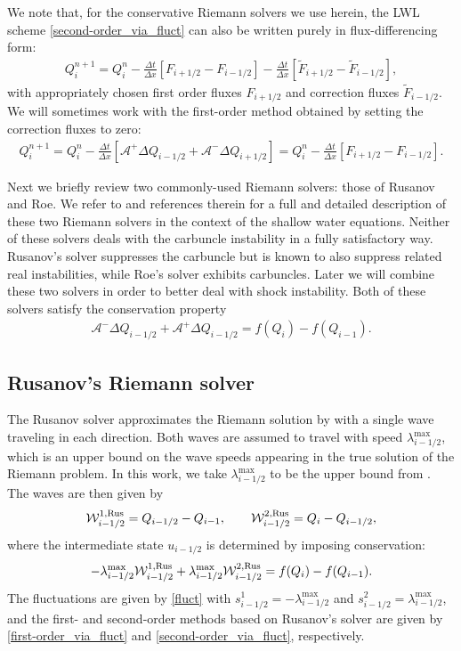 \documentclass[preprint, 11pt]{article}
\newcommand{\W}{{\mathcal W}}
\newcommand{\A}{{\mathcal A}}
\newcommand{\apdq}{\A^+ \!\!{\Delta} Q}
\newcommand{\amdq}{\A^- \!\!{\Delta} Q}
\newcommand{\imh}{{i-1/2}}
\newcommand{\iph}{{i+1/2}}
\newcommand{\bff}{{f}}
\newcommand{\bfF}{{F}}
\newcommand{\bfu}{{u}}
\newcommand{\bfq}{{Q}}
\newcommand{\Rus}{{\rm Rus}}
\begin{document}
We note that, for the conservative Riemann solvers we use herein, the LWL scheme
\eqref{second-order_via_fluct} can also be written purely in flux-differencing
form:
\begin{align}\label{flux-differencing-form}
  Q_i^{n+1}=Q_i^n-\frac{\Delta t}{\Delta x}\left[\bfF_{i+1/2}-\bfF_{i-1/2}\right]
 -\frac{\Delta t}{\Delta x}\left[\tilde{F}_{i+1/2}-\tilde{F}_{i-1/2}\right],
\end{align}
with appropriately chosen first order fluxes $\bfF_{i+1/2}$ and correction
fluxes $\tilde{F}_{i-1/2}$.
We will sometimes work with
the first-order method obtained by setting the correction fluxes to zero:
\begin{align}\label{first-order_via_fluct}
  Q_i^{n+1} = Q_i^n-\frac{\Delta t}{\Delta x}\left[\apdq_\imh+\amdq_\iph\right]
 = Q_i^n -\frac{\Delta t}{\Delta x}\left[\bfF_{i+1/2}-\bfF_{i-1/2}\right].
\end{align}

Next we briefly review two commonly-used Riemann solvers: those of Rusanov and
Roe.  We refer to \cite{ketcheson2020riemann} and references therein for
a full and detailed description of these two Riemann solvers in the context of
the shallow water equations.
Neither of these solvers deals with the carbuncle instability in a fully
satisfactory way.  Rusanov's solver suppresses the carbuncle but is known to
also suppress related real instabilities, while Roe's solver exhibits carbuncles.
Later we will combine these two solvers in order to better deal with shock instability.
Both of these solvers satisfy the conservation property
\begin{align} \label{rs_conservation}
    \amdq_\imh + \apdq_\imh = \bff(\bfq_i) - \bff(\bfq_{i-1}).
\end{align}


\subsection{Rusanov's Riemann solver}\label{sec:rusanov}
The Rusanov solver approximates the Riemann solution by with a single wave traveling in each
direction.  Both waves are assumed to travel with speed $\lambda^{\max}_\imh$, which is an
upper bound on the wave speeds appearing in the true solution of the Riemann problem.
In this work, we take $\lambda_{i-1/2}^{\max}$ to be the upper bound
from \cite[Prop. 3.7]{azerad2017well}.
The waves are then given by
\begin{align}\label{rusanov_waves}
  \W_{i-1/2}^{1,\Rus}=\bfq_{i-1/2}-\bfq_{i-1}, \qquad
  \W_{i-1/2}^{2,\Rus}=\bfq_{i}-\bfq_{i-1/2},
\end{align}
where the intermediate state $\bfu_{i-1/2}$ is determined by imposing conservation:
\begin{align}\label{rus_cons}
  -\lambda_{i-1/2}^{\max}\W_{i-1/2}^{1,\Rus}+\lambda_{i-1/2}^{\max}\W_{i-1/2}^{2,\Rus} = \bff(\bfq_{i})-\bff(\bfq_{i-1}).
\end{align}
The fluctuations are given by \eqref{fluct} with $s_{i-1/2}^1=-\lambda_{i-1/2}^{\max}$
and $s_{i-1/2}^2=\lambda_{i-1/2}^{\max}$, and the first- and second-order methods based
on Rusanov's solver are given by \eqref{first-order_via_fluct} and \eqref{second-order_via_fluct}, respectively.
\end{document}
